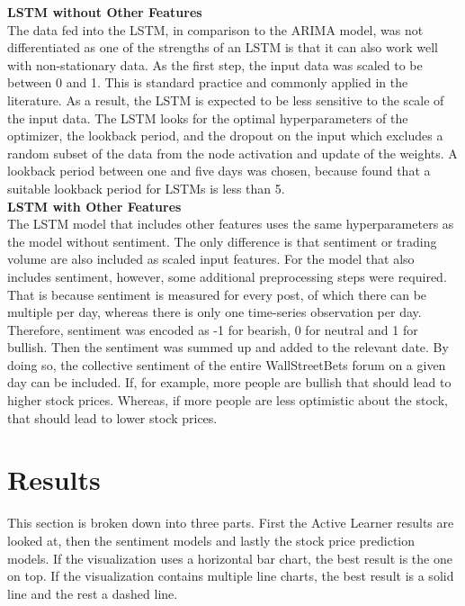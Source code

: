 \documentclass[11pt, a4paper]{article}
\begin{document}
\noindent\textbf{LSTM without Other Features}\\
The data fed into the LSTM, in comparison to the ARIMA model, was not differentiated as one of the strengths of an LSTM is that it can also work well with non-stationary data.
As the first step, the input data was scaled to be between 0 and 1. This is standard practice and commonly applied in the literature. As a result, the LSTM is expected to be
less sensitive to the scale of the input data.
The LSTM looks for the optimal hyperparameters of the optimizer, the lookback period, and the dropout on the input which excludes a random subset of the data from the node activation and update of the weights.
A lookback period between one and five days was chosen, because \cite{saud2020lookback} found that a suitable lookback period for LSTMs is less than 5. \\

\noindent\textbf{LSTM with Other Features}\\
The LSTM model that includes other features uses the same hyperparameters as the model without sentiment. The only difference is
that sentiment or trading volume are also included as scaled input features.
For the model that also includes sentiment, however, some additional preprocessing steps were required. That is because sentiment is measured for every post, of which there
can be multiple per day, whereas there is only one time-series observation per day.
Therefore, sentiment was encoded as -1 for bearish, 0 for neutral and 1 for bullish. Then the sentiment was summed up and added
to the relevant date. 
By doing so, the collective sentiment of the entire WallStreetBets forum on a given day can be included. If, for example, more people are bullish that should lead to higher stock prices.
Whereas, if more people are less optimistic about the stock, that should lead to lower stock prices.



\section{Results}

This section is broken down into three parts. First the Active Learner results are looked at, then the sentiment models and
lastly the stock price prediction models. If the visualization uses a horizontal bar chart, the best result is the one on top.
If the visualization contains multiple line charts, the best result is a solid line and the rest a dashed line.
\end{document}
